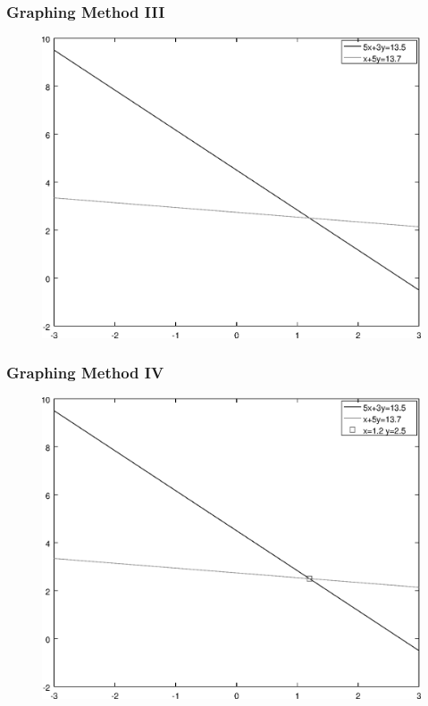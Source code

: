 \documentclass[xcolor=dvipsnames]{beamer}
\begin{document}
\begin{frame}
  \frametitle{Graphing Method III}
  \begin{figure}[h]
    \includegraphics[scale=.6]{./diagrams/gm-03-SystemsEquations-02.eps}
  \end{figure}
\end{frame}

\begin{frame}
  \frametitle{Graphing Method IV}
  \begin{figure}[h]
    \includegraphics[scale=.6]{./diagrams/gm-03-SystemsEquations-03.eps}
  \end{figure}
\end{frame}
\end{document}
